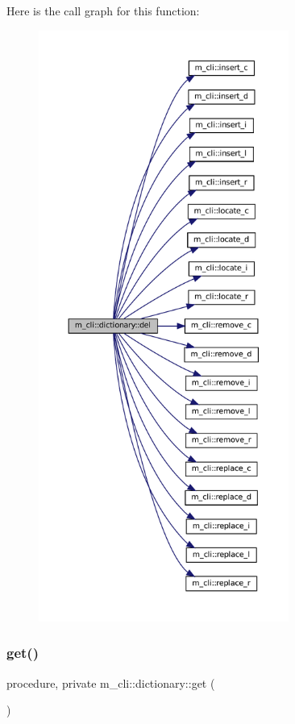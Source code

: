 Here is the call graph for this function\+:\nopagebreak
\begin{figure}[H]
\begin{center}
\leavevmode
\includegraphics[height=550pt]{structm__cli_1_1dictionary_aea651d5f1d801e67a9af3ebb863c537c_cgraph}
\end{center}
\end{figure}
\mbox{\label{structm__cli_1_1dictionary_a00a446dbb6b83b8656f681c5d8ee6c3b}} 
\subsubsection{\texorpdfstring{get()}{get()}}
{\footnotesize\ttfamily procedure, private m\+\_\+cli\+::dictionary\+::get (\begin{DoxyParamCaption}{ }\end{DoxyParamCaption})\hspace{0.3cm}{\ttfamily [private]}}

